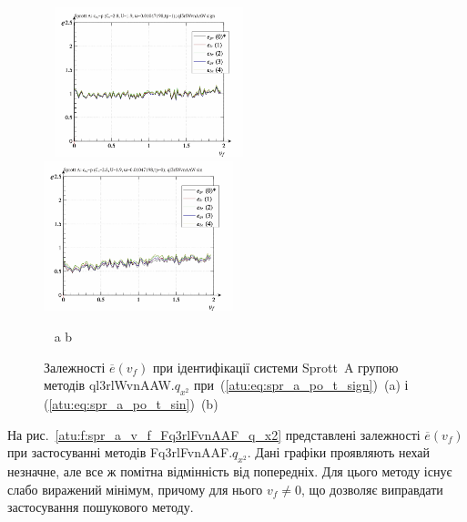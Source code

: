 \begin{figure}[htb!]
\begin{center}
  ~ \hfill
    \includegraphics[width=0.49\textwidth]{p/cha/spr_a/ql3rlWvnAAW_x2/sprott_a_id-p_v_f_sign.png}
    \hfill
    \includegraphics[width=0.49\textwidth]{p/cha/spr_a/ql3rlWvnAAW_x2/sprott_a_id-p_v_f_sin.png}
  \hfill ~
\end{center}
  \vspace{-1.0ex}
  \begin{center}
    ~ \hfill a \hfill\hfill b \hfill ~
  \end{center}
  \caption{Залежності $\overline{e} (v_f)$ при ідентифікації системи Sprott~A групою методів ql3rlWvnAAW.$q_{x^2}$ при~(\ref{atu:eq:spr_a_po_t_sign})~(a) і (\ref{atu:eq:spr_a_po_t_sin})~(b)}
  \label{atu:f:spr_a_v_f_ql3rlWvnAAW_q_x2}
\end{figure}

На рис.~\ref{atu:f:spr_a_v_f_Fq3rlFvnAAF_q_x2} представлені залежності
$\overline{e}(v_f)$ при застосуванні методів Fq3rlFvnAAF.$q_{x^2}$. Дані графіки проявляють нехай незначне, але все ж
помітна відмінність від попередніх. Для цього методу існує
слабо виражений мінімум, причому для нього
$v_f \ne 0$, що дозволяє виправдати застосування пошукового методу.

